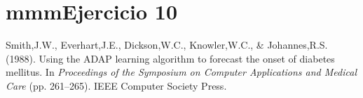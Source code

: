 \section*{mmmEjercicio 10}


\begin{thebibliography}{99}


 Smith,J.W., Everhart,J.E., Dickson,W.C., Knowler,W.C., \& Johannes,R.S. (1988). Using the ADAP learning algorithm to forecast
the onset of diabetes mellitus.  In {\it Proceedings of the Symposium on Computer Applications and Medical Care} (pp. 261--265).  IEEE
Computer Society Press.
\end{thebibliography}

